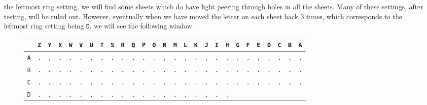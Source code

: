 the leftmost ring setting, we will find some sheets which do have
light peering through holes in all the sheets. Many of these
settings, after testing, will be ruled out. However, eventually when
we have moved the letter on each sheet back $3$ times, which
corresponds to the leftmost ring setting being \texttt{D}, we will
see the following window
\begin{figure}[H]
	\begin{center}
		\scalebox{0.5} {
			\begin{tabular}{c|cccccccccccccccccccccccccc}
				           & \texttt{Z} & \texttt{Y} & \texttt{X} & \texttt{W} &
				\texttt{V} & \texttt{U} & \texttt{T} & \texttt{S} &
				\texttt{R} & \texttt{Q} & \texttt{P} & \texttt{O} &
				\texttt{N} & \texttt{M} & \texttt{L} & \texttt{K} &
				\texttt{J} & \texttt{I} & \texttt{H} & \texttt{G} &
				\texttt{F} & \texttt{E} & \texttt{D} & \texttt{C} &
				\texttt{B} & \texttt{A}
				\\ \hline
				\texttt{A} & \texttt{.} & \texttt{.} & \texttt{.} &
				\texttt{.} & \texttt{.} & \texttt{.} & \texttt{.} &
				\texttt{.} & \texttt{.} & \texttt{.} & \texttt{.} &
				\texttt{.} & \texttt{.} & \texttt{.} & \texttt{.} &
				\texttt{.} & \texttt{.} & \texttt{.} & \texttt{.} &
				\texttt{.} & \texttt{.} & \texttt{.} & \texttt{.} &
				\texttt{.} & \texttt{.} & \texttt{.}                             \\
				\texttt{B} & \texttt{.} & \texttt{.} & \texttt{.} &
				\texttt{.} & \texttt{.} & \texttt{.} & \texttt{.} &
				\texttt{.} & \texttt{.} & \texttt{.} & \texttt{.} &
				\texttt{.} & \texttt{.} & \texttt{.} & \texttt{.} &
				\texttt{.} & \texttt{.} & \texttt{.} & \texttt{.} &
				\texttt{.} & \texttt{.} & \texttt{.} & \texttt{.} &
				\texttt{.} & \texttt{.} & \texttt{.}                             \\
				\texttt{C} & \texttt{.} & \texttt{.} & \texttt{.} &
				\texttt{.} & \texttt{.} & \texttt{.} & \texttt{.} &
				\texttt{.} & \texttt{.} & \texttt{.} & \texttt{.} &
				\texttt{.} & \texttt{.} & \texttt{.} & \texttt{.} &
				\texttt{.} & \texttt{.} & \texttt{.} & \texttt{.} &
				\texttt{.} & \texttt{.} & \texttt{.} & \texttt{.} &
				\texttt{.} & \texttt{.} & \texttt{.}                             \\
				\texttt{D} & \texttt{.} & \texttt{.} & \texttt{.} &
				\texttt{.} & \texttt{.} & \texttt{.} & \texttt{.} &
				\texttt{.} & \texttt{.} & \texttt{.} & \texttt{.} &
				\texttt{.} & \texttt{.} & \texttt{.} & \texttt{.} &
				\texttt{.} & \texttt{.} & \texttt{.} & \texttt{.} &

\end{tabular}}
\end{center}
\end{figure}
